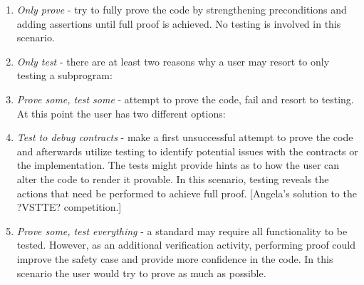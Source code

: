 \documentclass{llncs}
\begin{document}
\begin {enumerate}
\item \emph{Only prove} - try to fully prove
  the code by strengthening preconditions and adding assertions until
  full proof is achieved. No testing is involved in this scenario.

\item \emph{Only test} - there are at least two reasons why a user
   may resort to only testing a subprogram:



\item \emph{Prove some, test some} - attempt to prove the code, fail
  and resort to testing. At this point the user has two different
  options:


\item \emph{Test to debug contracts} - make a first unsuccessful
  attempt to prove the code and afterwards utilize testing to identify
  potential issues with the contracts or the implementation. The tests
  might provide hints as to how the user can alter the code to render
  it provable. In this scenario, testing reveals the actions that need
  be performed to achieve full proof. [Angela's solution to the
  ?VSTTE? competition.]

\item \emph{Prove some, test everything} - a standard may require
  all functionality to be tested. 
  However, as an additional verification activity, performing proof could
  improve the safety case and provide more confidence in the code. In
  this scenario the user would try to prove as much as possible.
\end{enumerate}
\end{document}
